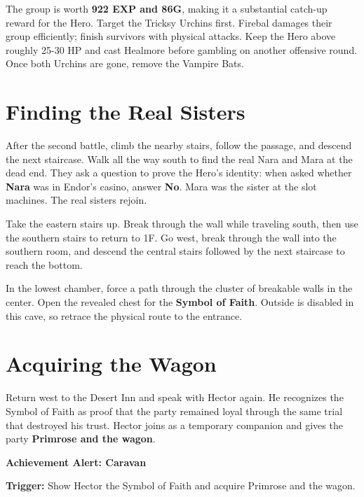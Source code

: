 \documentclass[
  american,
  10pt,
  letterpaper,
  oneside,
  open=any]{scrreprt}
\begin{document}
The group is worth \textbf{922 EXP and 86G}, making it a substantial
catch-up reward for the Hero. Target the Tricksy Urchins first. Firebal
damages their group efficiently; finish survivors with physical attacks.
Keep the Hero above roughly 25-30 HP and cast Healmore before gambling
on another offensive round. Once both Urchins are gone, remove the
Vampire Bats.

\section{Finding the Real Sisters}\label{finding-the-real-sisters}

After the second battle, climb the nearby stairs, follow the passage,
and descend the next staircase. Walk all the way south to find the real
Nara and Mara at the dead end. They ask a question to prove the Hero's
identity: when asked whether \textbf{Nara} was in Endor's casino, answer
\textbf{No}. Mara was the sister at the slot machines. The real sisters
rejoin.

Take the eastern stairs up. Break through the wall while traveling
south, then use the southern stairs to return to 1F. Go west, break
through the wall into the southern room, and descend the central stairs
followed by the next staircase to reach the bottom.

In the lowest chamber, force a path through the cluster of breakable
walls in the center. Open the revealed chest for the \textbf{Symbol of
Faith}. Outside is disabled in this cave, so retrace the physical route
to the entrance.

\section{Acquiring the Wagon}\label{acquiring-the-wagon}

Return west to the Desert Inn and speak with Hector again. He recognizes
the Symbol of Faith as proof that the party remained loyal through the
same trial that destroyed his trust. Hector joins as a temporary
companion and gives the party \textbf{Primrose and the wagon}.

\begin{achievementalert}

\textbf{Achievement Alert: Caravan}

\textbf{Trigger:} Show Hector the Symbol of Faith and acquire Primrose
and the wagon.

\end{achievementalert}
\end{document}
